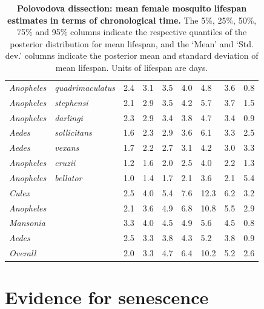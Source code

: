 \documentclass[12pt]{article}
\begin{document}
\begin{table}[htbp!]
\begin{tabular}{l|l|l|l|l|l|l|l|l}
		\textit{Anopheles} & \textit{quadrimaculatus} & 2.4 & 3.1 & 3.5 & 4.0 & 4.8 & 3.6 & 0.8 \\
		\textit{Anopheles} & \textit{stephensi} & 2.1 & 2.9 & 3.5 & 4.2 & 5.7 & 3.7 & 1.5 \\
		\textit{Anopheles} & \textit{darlingi} & 2.3 & 2.9 & 3.4 & 3.8 & 4.7 & 3.4 & 0.9 \\
		\textit{Aedes} & \textit{sollicitans} & 1.6 & 2.3 & 2.9 & 3.6 & 6.1 & 3.3 & 2.5 \\
		\textit{Aedes} & \textit{vexans} & 1.7 & 2.2 & 2.7 & 3.1 & 4.2 & 3.0 & 3.3 \\
		\textit{Anopheles} & \textit{cruzii} & 1.2 & 1.6 & 2.0 & 2.5 & 4.0 & 2.2 & 1.3 \\
		\textit{Anopheles} & \textit{bellator} & 1.0 & 1.4 & 1.7 & 2.1 & 3.6 & 2.1 & 5.4 \\
		\hline
		\textit{Culex} & \textit{} & 2.5 & 4.0 & 5.4 & 7.6 & 12.3 & 6.2 & 3.2 \\
		\textit{Anopheles} & \textit{} & 2.1 & 3.6 & 4.9 & 6.8 & 10.8 & 5.5 & 2.9 \\
		\textit{Mansonia} & \textit{} & 3.3 & 4.0 & 4.5 & 4.9 & 5.6 & 4.5 & 0.8 \\
		\textit{Aedes} & \textit{} & 2.5 & 3.3 & 3.8 & 4.3 & 5.2 & 3.8 & 0.9 \\
		\hline
		\textit{Overall} & \textit{} & 2.0 & 3.3 & 4.7 & 6.4 & 10.2 & 5.2 & 2.6 \\
	\end{tabular}
	\caption{\textbf{Polovodova dissection: mean female mosquito lifespan estimates in terms of chronological time.} The 5\%, 25\%, 50\%, 75\% and 95\% columns indicate the respective quantiles of the posterior distribution for mean lifespan, and the `Mean' and `Std. dev.' columns indicate the posterior mean and standard deviation of mean lifespan. Units of lifespan are days.}
	\label{tab:dissection_estimated_lifespans_chron}%
\end{table}


\section{Evidence for senescence}
\end{document}

